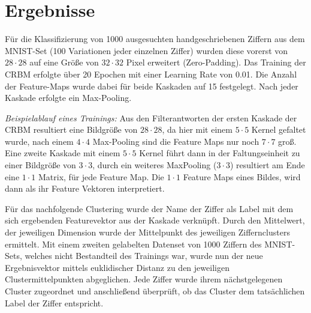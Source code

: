 \section{Ergebnisse}\label{results}
Für die Klassifizierung von 1000 ausgesuchten handgeschriebenen Ziffern aus dem MNIST-Set (100 Variationen jeder einzelnen Ziffer) wurden diese vorerst von $28 \cdot 28$ auf eine Größe von $32 \cdot 32$ Pixel erweitert (Zero-Padding). Das Training der CRBM erfolgte über 20 Epochen mit einer Learning Rate von 0.01. Die Anzahl der Feature-Maps wurde dabei für beide Kaskaden auf 15 festgelegt.
Nach jeder Kaskade erfolgte ein Max-Pooling. 
\newline 

\textit{Beispielablauf eines Trainings:}
Aus den Filterantworten der ersten Kaskade der CRBM resultiert eine Bildgröße von $28 \cdot 28$, da hier mit einem $5 \cdot 5$ Kernel gefaltet wurde, nach einem $4 \cdot 4$ Max-Pooling sind die Feature Maps nur noch $7 \cdot 7$ groß. Eine zweite Kaskade mit einem  $5 \cdot 5$ Kernel führt dann in der Faltungseinheit zu einer Bildgröße von $3 \cdot 3$, durch ein weiteres MaxPooling ($3 \cdot 3$) resultiert am Ende eine $1 \cdot 1$ Matrix, für jede Feature Map. Die $1 \cdot 1$ Feature Maps eines Bildes, wird dann als ihr Feature Vektoren interpretiert.

Für das nachfolgende Clustering wurde der Name der Ziffer als Label mit dem sich ergebenden Featurevektor aus der Kaskade verknüpft. Durch den Mittelwert, der jeweiligen Dimension wurde der Mittelpunkt des jeweiligen Ziffernclusters ermittelt.
Mit einem zweiten gelabelten Datenset von 1000 Ziffern des MNIST-Sets, welches nicht Bestandteil des Trainings war, wurde nun der neue Ergebnisvektor mittels euklidischer Distanz zu den jeweiligen Clustermittelpunkten abgeglichen. Jede Ziffer wurde ihrem nächstgelegenen Cluster zugeordnet und anschließend überprüft, ob das Cluster dem tatsächlichen Label der Ziffer entspricht.\newline

